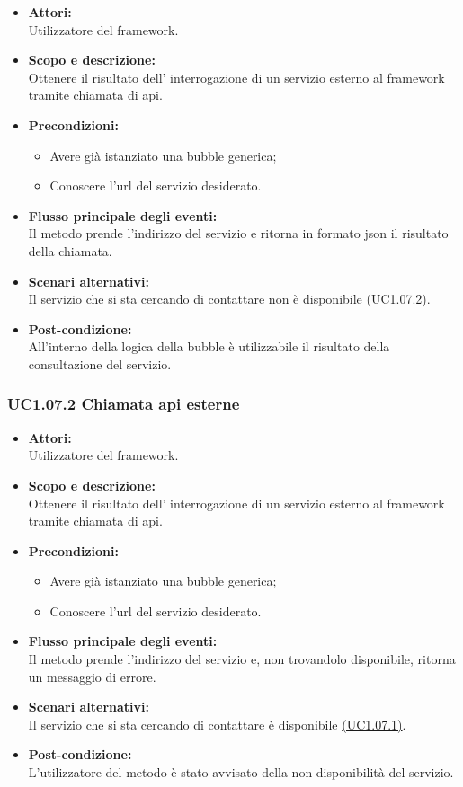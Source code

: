 \begin{itemize}
	\item \textbf{Attori:}
	\\Utilizzatore del framework.
	\item \textbf{Scopo e descrizione:} 
	\\Ottenere il risultato dell’ interrogazione di un servizio esterno al framework tramite chiamata di api.
	\item \textbf{Precondizioni:}
	\begin{itemize}
		\item Avere già istanziato una bubble generica;
		\item Conoscere l'url del servizio desiderato.
	\end{itemize}
	\item \textbf{Flusso principale degli eventi:}
	\\Il metodo prende l'indirizzo del servizio e ritorna in formato json il risultato della chiamata.
	\item \textbf{Scenari alternativi:}
	\\Il servizio che si sta cercando di contattare non è disponibile \hyperref[UC1.07.2]{(UC1.07.2)}.
	\item \textbf{Post-condizione:}
	\\All’interno della logica della bubble è utilizzabile il risultato della consultazione del servizio.
\end{itemize}

\subsubsection{UC1.07.2 Chiamata api esterne} \label{UC1.07.2}

\begin{itemize}
	\item \textbf{Attori:}
	\\Utilizzatore del framework.
	\item \textbf{Scopo e descrizione:} 
	\\Ottenere il risultato dell’ interrogazione di un servizio esterno al framework tramite chiamata di api.
	\item \textbf{Precondizioni:}
	\begin{itemize}
		\item Avere già istanziato una bubble generica;
		\item Conoscere l'url del servizio desiderato.
	\end{itemize}
	\item \textbf{Flusso principale degli eventi:}
	\\Il metodo prende l'indirizzo del servizio e, non trovandolo disponibile, ritorna un messaggio di errore.
	\item \textbf{Scenari alternativi:}
	\\Il servizio che si sta cercando di contattare è disponibile \hyperref[UC1.07.1]{(UC1.07.1)}.
	\item \textbf{Post-condizione:}
	\\L’utilizzatore del metodo è stato avvisato della non disponibilità del servizio.
\end{itemize}


